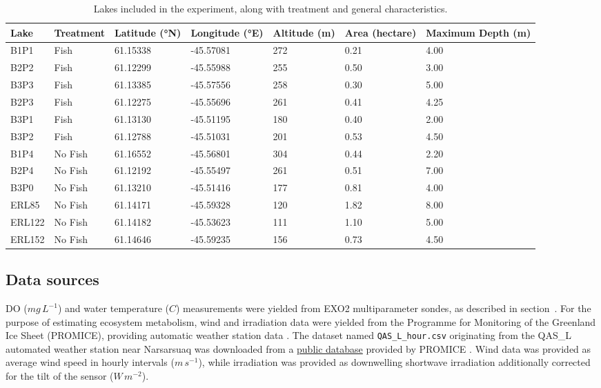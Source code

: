 \documentclass[11pt,lineno]{manuscript}\usepackage[]{graphicx}\usepackage[]{xcolor}
\begin{document}
\begin{table}[ht]
\centering
\caption{Lakes included in the experiment, along with treatment
                and general characteristics.} 
\label{tab:lakes}
\begin{tabular}{lllllll}
  \toprule
Lake & Treatment & Latitude (°N) & Longitude (°E) & Altitude (m) & Area (hectare) & Maximum Depth (m) \\ 
  \midrule
B1P1 & Fish & 61.15338 & -45.57081 & 272 & 0.21 & 4.00 \\ 
  B2P2 & Fish & 61.12299 & -45.55988 & 255 & 0.50 & 3.00 \\ 
  B3P3 & Fish & 61.13385 & -45.57556 & 258 & 0.30 & 5.00 \\ 
  B2P3 & Fish & 61.12275 & -45.55696 & 261 & 0.41 & 4.25 \\ 
  B3P1 & Fish & 61.13130 & -45.51195 & 180 & 0.40 & 2.00 \\ 
  B3P2 & Fish & 61.12788 & -45.51031 & 201 & 0.53 & 4.50 \\ 
  B1P4 & No Fish & 61.16552 & -45.56801 & 304 & 0.44 & 2.20 \\ 
  B2P4 & No Fish & 61.12192 & -45.55497 & 261 & 0.51 & 7.00 \\ 
  B3P0 & No Fish & 61.13210 & -45.51416 & 177 & 0.81 & 4.00 \\ 
  ERL85 & No Fish & 61.14171 & -45.59328 & 120 & 1.82 & 8.00 \\ 
  ERL122 & No Fish & 61.14182 & -45.53623 & 111 & 1.10 & 5.00 \\ 
  ERL152 & No Fish & 61.14646 & -45.59235 & 156 & 0.73 & 4.50 \\ 
   \bottomrule
\end{tabular}
\end{table}


\subsection{Data sources} \label{subsec:source}

DO ($mg\,L^{-1}$) and water temperature (\textdegree{}$C$) measurements
were yielded from EXO2 multiparameter
sondes, as described in section~. For the purpose
of estimating ecosystem metabolism, wind and irradiation data were yielded
from the Programme for Monitoring of the Greenland Ice Sheet (PROMICE), providing automatic
weather station data \citep{Fausto:2021}.
The dataset named \texttt{QAS\_L\_hour.csv} originating from the QAS\_L automated weather station
near Narsarsuaq was downloaded from a
\href{https://dataverse.geus.dk/citation?persistentId=doi:10.22008/FK2/IW73UU}{public database}
provided by PROMICE \citep{metadata}.
Wind data was provided as average wind speed in hourly intervals ($m\,s^{-1}$), while
irradiation was provided as downwelling shortwave irradiation additionally
corrected for the tilt of the sensor ($W\,m^{-2}$).
\end{document}
